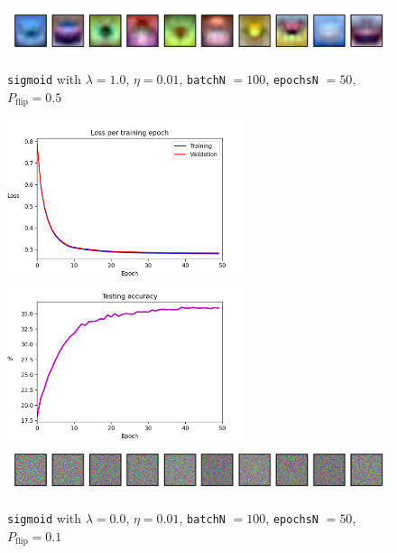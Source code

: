 \documentclass{article}
\begin{document}
\begin{figure}[h!]
		\includegraphics[width=12cm]{../plots/weights_v10.png}
		\caption{\texttt{sigmoid} with $\lambda=1.0$, $\eta=0.01$, \texttt{batchN} $=100$, \texttt{epochsN} $=50$, $P_{\text{flip}}=0.5$}
		\vspace{0.2cm}
		\includegraphics[width=7cm]{../plots/loss_v11.png}
		\includegraphics[width=7cm]{../plots/acc_v11.png}
		\includegraphics[width=12cm]{../plots/weights_v11.png}
		\caption{\texttt{sigmoid} with $\lambda=0.0$, $\eta=0.01$, \texttt{batchN} $=100$, \texttt{epochsN} $=50$, $P_{\text{flip}}=0.1$}
	\end{figure}
\end{document}
